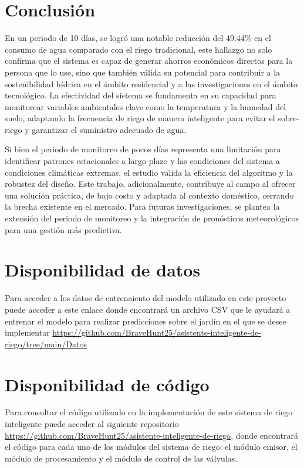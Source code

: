 \documentclass[pdflatex,sn-mathphys-num]{sn-jnl}%
\theoremstyle{thmstyleone}%
\theoremstyle{thmstyletwo}%
\theoremstyle{thmstylethree}%
\begin{document}
\begin{multicols}{2}
\section*{Conclusión}

En un periodo de 10 días, se logró una notable reducción del 49.44\% en el consumo de agua comparado con el riego tradicional, este hallazgo no solo confirma que el sistema es capaz de generar ahorros económicos directos para la persona que lo use, sino que también válida su potencial para contribuir a la sostenibilidad hídrica en el ámbito residencial y a las investigaciones en el ámbito tecnológico. La efectividad del sistema se fundamenta en su capacidad para monitorear variables ambientales clave como la temperatura y la humedad del suelo, adaptando la frecuencia de riego de manera inteligente para evitar el sobre-riego y garantizar el suministro adecuado de agua.

Si bien el periodo de monitoreo de pocos días representa una limitación para identificar patrones estacionales a largo plazo y las condiciones del sistema a condiciones climáticas extremas, el estudio valida la eficiencia del algoritmo y la robustez del diseño. Este trabajo, adicionalmente, contribuye al campo al ofrecer una solución práctica, de bajo costo y adaptada al contexto doméstico, cerrando la brecha existente en el mercado. Para futuras investigaciones, se plantea la extensión del periodo de monitoreo y la integración de pronósticos meteorológicos para una gestión más predictiva.

\section*{Disponibilidad de datos}
Para acceder a los datos de entrenaiento del modelo utilizado en este proyecto puede acceder a este enlace donde encontrará un archivo CSV que le ayudará a entrenar el modelo para realizar predicciones sobre el jardín en el que se desee implementar \url{https://github.com/BraveHunt25/asistente-inteligente-de-riego/tree/main/Datos}

\section*{Disponibilidad de código}
Para consultar el código utilizado en la implementación de este sistema de riego inteligente puede acceder al siguiente repositorio \url{https://github.com/BraveHunt25/asistente-inteligente-de-riego}, donde encontrará el código para cada uno de los módulos del sistema de riego: el módulo emisor, el módulo de procesamiento y el módulo de control de las válvulas.


\end{multicols}
\end{document}
